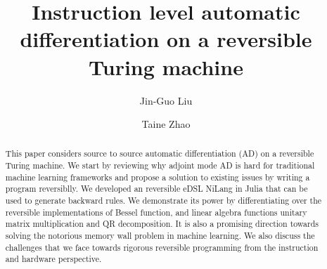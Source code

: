 \documentclass[aps,twocolumn,longbibliography,english,superscriptaddress]{revtex4-1}
\newcommand{\<}{\langle}
\renewcommand{\>}{\rangle}
\theoremstyle{definition}\newtheorem{definition}{\textit{Definition}}
\begin{document}
\title{Instruction level automatic differentiation on a reversible Turing machine}


\author{Jin-Guo Liu}

\author{Taine Zhao}

\begin{abstract}
    This paper considers source to source automatic differentiation (AD) on a reversible Turing machine. We start by reviewing why adjoint mode AD is hard for traditional machine learning frameworks and propose a solution to existing issues by writing a program reversiblly. We developed an reversible eDSL NiLang in Julia that can be used to generate backward rules. We demonstrate its power by differentiating over the reversible implementations of Bessel function, and linear algebra functions unitary matrix multiplication and QR decomposition. It is also a promising direction towards solving the notorious memory wall problem in machine learning. We also discuss the challenges that we face towards rigorous reversible programming from the instruction and hardware perspective.
\end{abstract}


\maketitle

\end{document}
